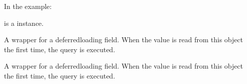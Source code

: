 \documentclass[letterpaper,10pt,french]{sphinxmanual}
\begin{document}
\begin{fulllineitems}
\begin{fulllineitems}
\sphinxAtStartPar
In the example:

\begin{sphinxVerbatim}[commandchars=\\\{\}]
 
       
\end{sphinxVerbatim}

\sphinxAtStartPar
{} is a  instance.

\end{fulllineitems}


\begin{fulllineitems}
\label{\detokenize{main/model:main.models.Parcours.domaine_id}}
\pysigstartsignatures
{}
\pysigstopsignatures
\end{fulllineitems}


\begin{fulllineitems}
\label{\detokenize{main/model:main.models.Parcours.id}}
\pysigstartsignatures
{}
\pysigstopsignatures
\sphinxAtStartPar
A wrapper for a deferred\sphinxhyphen{}loading field. When the value is read from this
object the first time, the query is executed.

\end{fulllineitems}


\begin{fulllineitems}
\label{\detokenize{main/model:main.models.Parcours.nom}}
\pysigstartsignatures
{}
\pysigstopsignatures
\sphinxAtStartPar
A wrapper for a deferred\sphinxhyphen{}loading field. When the value is read from this
object the first time, the query is executed.

\end{fulllineitems}


\end{fulllineitems}
\end{document}
